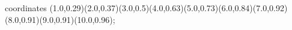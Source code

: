 					coordinates { (1.0,0.29)(2.0,0.37)(3.0,0.5)(4.0,0.63)(5.0,0.73)(6.0,0.84)(7.0,0.92)(8.0,0.91)(9.0,0.91)(10.0,0.96)};